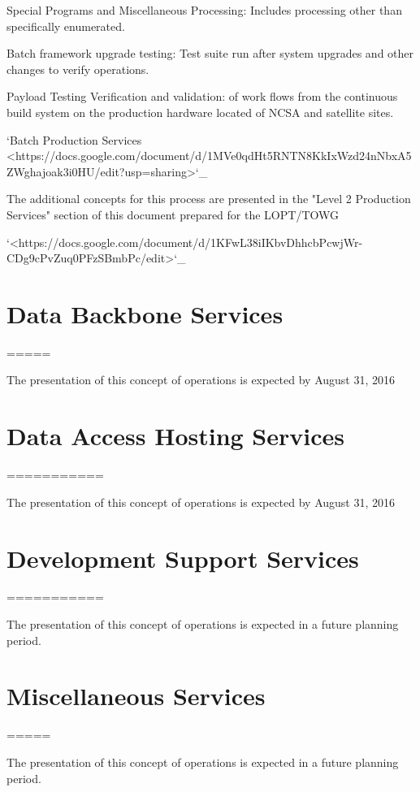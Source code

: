 {{{{{Special Programs and Miscellaneous Processing: Includes processing
other than specifically enumerated.

Batch framework upgrade testing: Test suite run after system upgrades
and other  changes to verify operations.

Payload Testing Verification and validation: of work flows from the
continuous build system on the production hardware located of NCSA and
satellite sites.


`Batch Production Services <https://docs.google.com/document/d/1MVe0qdHt5RNTN8KkIxWzd24nNbxA5ZWghajoak3i0HU/edit?usp=sharing>`_

The additional concepts for this process are presented in the "Level 2
Production Services" section of this document prepared for the
LOPT/TOWG

`<https://docs.google.com/document/d/1KFwL38iIKbvDhhcbPcwjWr-CDg9cPvZuq0PFzSBmbPc/edit>`_


\section{ Data Backbone Services}
=====

The presentation of this concept of operations is expected by August 31, 2016

\section{ Data Access Hosting Services}
===========

The presentation of this concept of operations is expected by August 31, 2016


\section{ Development Support Services}
===========

The presentation of this concept of operations is expected in a future planning period.

\section{ Miscellaneous Services}
=====

The presentation of this concept of operations is expected in a future planning period.



}}}}}
